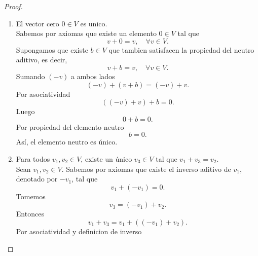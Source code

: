 \documentclass[12pt,a4paper]{article}
\begin{document}
    \begin{proof}
        \begin{enumerate}
            \item[(a)] El vector cero $0\in V$ es unico.\\
            Sabemos por axiomas que existe un elemento $0\in V$ tal que
            \begin{equation*}
                v+0=v, \quad \forall v\in V.
            \end{equation*}
            Supongamos que existe $b\in V$ que tambien satisfacen la propiedad del neutro aditivo, es decir,
            \begin{equation*}
                v+b=v,\quad \forall v\in V.
            \end{equation*}
            Sumando $(-v)$ a ambos lados
            \begin{equation*}
                (-v)+(v+b)=(-v)+v.
            \end{equation*}
            Por asociatividad
            \begin{equation*}
                ((-v)+v)+b=0.
            \end{equation*}
            Luego
            \begin{equation*}
                0+b=0.
            \end{equation*}
            Por propiedad del elemento neutro
            \begin{equation*}
                b=0.
            \end{equation*}
            Así, el elemento neutro es único.
            \item[(b)] Para todos $v_{1},v_{2}\in V$, existe un único $v_{3}\in V$ tal que
            $v_{1}+v_{3}=v_{2}$.\\
            Sean $v_{1},v_{2}\in V$. Sabemos por axiomas que existe el inverso aditivo de $v_{1}$, denotado por
            $-v_{1}$, tal que
            \begin{equation*}
                v_{1}+(-v_{1})=0.
            \end{equation*}
            Tomemos
            \begin{equation*}
                v_{3}=(-v_{1})+v_{2}.
            \end{equation*}
            Entonces
            \begin{equation*}
                v_{1}+v_{3}=v_{1}+((-v_{1})+v_{2}).
            \end{equation*}
            Por asociatividad y definicion de inverso

\end{enumerate}
\end{proof}
\end{document}
